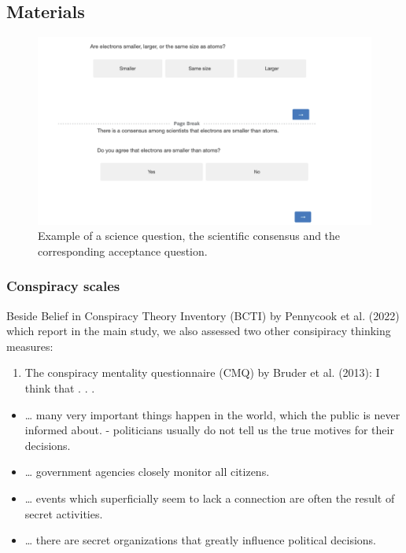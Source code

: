 \documentclass[
  doc,floatsintext]{apa6}
\providecommand{\tightlist}{%
  \setlength{\itemsep}{0pt}\setlength{\parskip}{0pt}}
\begin{document}
\subsection{Materials}\label{materials-2}

\FloatBarrier



\begin{figure}

\includegraphics[width=1\linewidth]{./figures/study1_question_example} \hfill{}

\caption{Example of a science question, the scientific consensus and the corresponding acceptance question.}\label{fig:stimulus-example}
\end{figure}

\subsubsection{Conspiracy scales}\label{conspiracy-scales}

Beside Belief in Conspiracy Theory Inventory (BCTI) by Pennycook et al. (2022) which report in the main study, we also assessed two other consipiracy thinking measures:

\begin{enumerate}
\def\labelenumi{\arabic{enumi}.}
\tightlist
\item
  The conspiracy mentality questionnaire (CMQ) by Bruder et al. (2013):
  I think that . . .
\end{enumerate}

\begin{itemize}
\tightlist
\item
  \ldots{} many very important things happen in the world, which the public is never informed about. - politicians usually do not tell us the true motives for their decisions.
\item
  \ldots{} government agencies closely monitor all citizens.
\item
  \ldots{} events which superficially seem to lack a connection are often the result of secret activities.
\item
  \ldots{} there are secret organizations that greatly influence political decisions.
\end{itemize}
\end{document}

